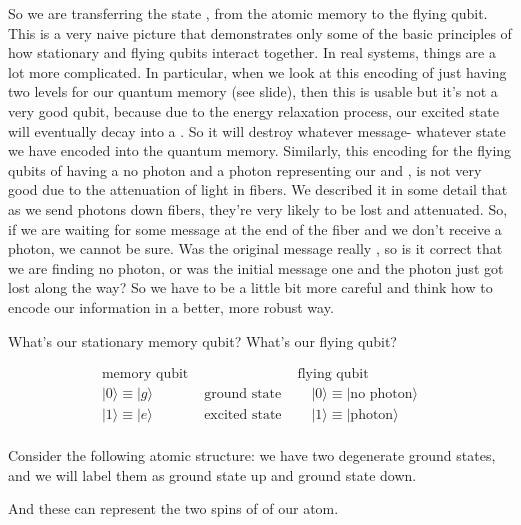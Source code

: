 So we are transferring the state \ket{+}, from the atomic memory to the flying qubit. This is a very naive picture that demonstrates only some of the basic principles of how stationary and flying qubits interact together. In real systems, things are a lot more complicated. In particular, when we look at this encoding of just having two levels for our quantum memory (see slide), then this is usable but it's not a very good qubit, because due to the energy relaxation process, our excited state will eventually decay into a . So it will destroy whatever message- whatever state we have encoded into the quantum memory. Similarly, this encoding for the flying qubits of having a no photon and a photon representing our  and , is not very good due to the attenuation of light in fibers. We described it in some detail that as we send photons down fibers, they're very likely to be lost and attenuated. So, if we are waiting for some message at the end of the fiber and we don't receive a photon, we cannot be sure. Was the original message really , so is it correct that we are finding no photon, or was the initial message one and the photon just got lost along the way? So we have to be a little bit more careful and think how to encode our information in a better, more robust way.

What's our stationary memory qubit? What's our flying qubit?

\begin{equation}
\begin{array}{lll}
\text{memory qubit} & & \text{flying qubit} \\

|0\rangle \equiv|g\rangle \quad & \text { ground state } & \quad|0\rangle \equiv \mid \text {no photon}\rangle \\
|1\rangle \equiv|e\rangle \quad & \text { excited state } & \quad|1\rangle \equiv \mid \text {photon}\rangle \\
\end{array}
\end{equation}

Consider the following atomic structure: we have two degenerate ground states, and we will label them as ground state up and ground state down.

And these can represent the two spins of of our atom.

